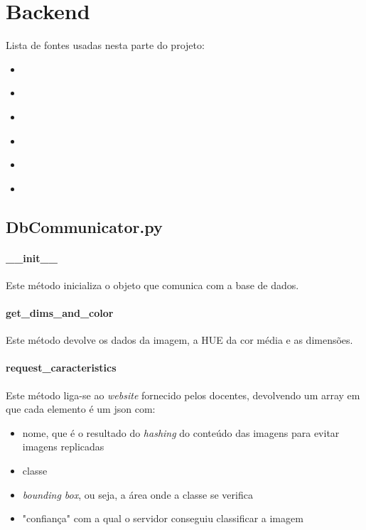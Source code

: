 \documentclass{report}
\begin{document}
\section{Backend}
Lista de fontes usadas nesta parte do projeto:
\begin{itemize}
\item \cite[\textit{Guião prático sobre CherryPy}]{guideCherryPy}
\item \cite[\textit{Guião prático sobre Bases de Dados}]{guideDB}
\item \cite[\textit{Guião prático sobre tratamento de imagem}]{guideIm}
\item \cite[\textit{Guião prático sobre aplicações móveis}]{guideMobi}
\item \cite[\textit{StackOverflow}]{SOvf}
\item \cite[\textit{Documentação relativa a CherryPy}]{CherryPy}
\end{itemize}
\subsection{DbCommunicator.py}
\paragraph{\_\_init\_\_}
Este método inicializa o objeto que comunica com a base de dados.

\paragraph{get\_dims\_and\_color}
Este método devolve os dados da imagem, a HUE da cor média e as dimensões. 

\paragraph{request\_caracteristics}
Este método liga-se ao \textit{website} fornecido pelos docentes, devolvendo um array em que cada elemento é um \ac{json} com:
\begin{itemize}
\item nome,  que é o resultado do \textit{hashing} do conteúdo das imagens para evitar imagens replicadas
\item classe
\item \textit{bounding box}, ou seja, a área onde a classe se verifica
\item "confiança" com a qual o servidor conseguiu classificar a imagem
\end{itemize}
\end{document}

